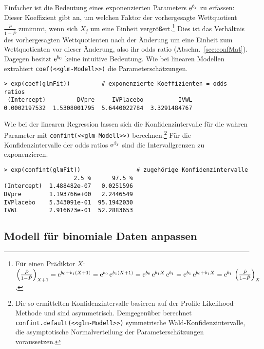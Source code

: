 Einfacher ist die Bedeutung eines exponenzierten Parameters ${\mathrm{e}}^{b_{j}}$ zu erfassen: Dieser Koeffizient gibt an, um welchen Faktor der vorhergesagte Wettquotient $\frac{\hat{P}}{1-\hat{P}}$ zunimmt, wenn sich $X_{j}$ um eine Einheit vergrößert.\footnote{Für einen Prädiktor $X$: $\left(\frac{\hat{P}}{1-\hat{P}}\right)_{X+1} = {\mathrm{e}}^{b_{0} + b_{1} (X + 1)} = {\mathrm{e}}^{b_{0}} \, {\mathrm{e}}^{b_{1} (X + 1)} = {\mathrm{e}}^{b_{0}} \, {\mathrm{e}}^{b_{1} X} \, {\mathrm{e}}^{b_{1}} = {\mathrm{e}}^{b_{1}} \, {\mathrm{e}}^{b_{0} + b_{1} X} = {\mathrm{e}}^{b_{1}} \, \left(\frac{\hat{P}}{1-\hat{P}}\right)_{X}$.} Dies ist das Verhältnis des vorhergesagten Wettquotienten nach der Änderung um eine Einheit zum Wettquotienten vor dieser Änderung, also ihr odds ratio (Abschn.\ \ref{sec:confMat}). Dagegen besitzt ${\mathrm{e}}^{b_{0}}$ keine intuitive Bedeutung. Wie bei linearen Modellen extrahiert \lstinline!coef(<<glm-Modell>>)! die Parameterschätzungen.
\begin{lstlisting}
> exp(coef(glmFit))         # exponenzierte Koeffizienten = odds ratios
 (Intercept)         DVpre     IVPlacebo          IVWL
0.0002197532  1.5308001795  5.6440022784  3.3291484767
\end{lstlisting}

Wie bei der linearen Regression lassen sich die Konfidenzintervalle für die wahren Parameter mit \lstinline!confint(<<glm-Modell>>)! berechnen.\footnote{\label{ftn:ciDefault}Die so ermittelten Konfidenzintervalle basieren auf der Profile-Likelihood-Methode und sind asymmetrisch. Demgegenüber berechnet \lstinline!confint.default(<<glm-Modell>>)! symmetrische Wald-Konfidenzintervalle, die asymptotische Normalverteilung der Parameterschätzungen voraussetzen.} Für die Konfidenzintervalle der odds ratios ${\mathrm{e}}^{\beta_{j}}$ sind die Intervallgrenzen zu exponenzieren.
\begin{lstlisting}
> exp(confint(glmFit))                # zugehörige Konfidenzintervalle
                    2.5 %      97.5 %
(Intercept)  1.488482e-07   0.0251596
DVpre        1.193766e+00   2.2446549
IVPlacebo    5.343091e-01  95.1942030
IVWL         2.916673e-01  52.2883653
\end{lstlisting}

\subsection{Modell für binomiale Daten anpassen}

